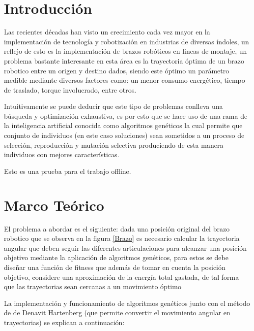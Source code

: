 \documentclass[12pt]{article}
\begin{document}

\tableofcontents

\thispagestyle{empty}
\pagebreak
\newpage
\setcounter{page}{1}


\section{Introducción}

Las recientes décadas han visto un crecimiento cada vez mayor en la implementación de tecnología y robotización en industrias de diversas índoles, un reflejo de esto es la implementación de brazos robóticos en lineas de montaje, un problema bastante interesante en esta área es la trayectoria óptima de un brazo robotico entre un origen y destino dados, siendo este óptimo un parámetro medible mediante diversos factores como: un menor consumo energético, tiempo de traslado, torque involucrado, entre otros.

Intuitivamente se puede deducir que este tipo de problemas conlleva una búsqueda y optimización exhaustiva, es por esto que se hace uso de una rama de la inteligencia artificial conocida como algoritmos genéticos la cual permite que conjunto de individuos (en este caso soluciones) sean sometidos a un proceso de selección, reproducción y mutación selectiva produciendo de esta manera individuos con mejores características.

Esto es una prueba para el trabajo offline.


\section{Marco Teórico}

El problema a abordar es el siguiente: dada una posición original del brazo robotico que se  observa en la figura \ref{Brazo} es necesario calcular la trayectoria angular que deben seguir las diferentes articulaciones para alcanzar una posición objetivo mediante la aplicación de algoritmos genéticos, para estos se debe diseñar una función de fitness que además de tomar en cuenta la posición objetivo, considere una aproximación de la energía total gastada, de tal forma que las trayectorias sean cercanas a un movimiento óptimo

La implementación y funcionamiento de algoritmos genéticos junto con el método de de Denavit Hartenberg (que permite convertir el movimiento angular en trayectorias) se explican a continuación:
\end{document}
